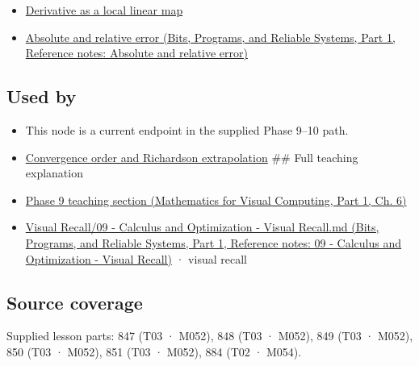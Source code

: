 \begin{itemize}
\tightlist
\item
  \hyperref[appendix-7bc181935c42]{Derivative as a local linear map}
\item
  \href{../01-Bits-Programs-and-Reliable-Systems-P01/main.pdf\#nameddest=appendix-3ae74e89b4e6}{Absolute and relative error (Bits, Programs, and Reliable Systems, Part 1, Reference notes: Absolute and relative error)}
\end{itemize}

\subsection{Used by}\label{appendix-e2d7b4f2161d-used-by}

\hypertarget{appendix-e2d7b4f2161d-used-by}{}

\begin{itemize}
\item
  This node is a current endpoint in the supplied Phase 9--10 path.
\item
  \hyperref[appendix-aca80b6bf17a]{Convergence order and Richardson extrapolation} \#\# Full teaching explanation
\item
  \href{../02-Mathematics-for-Visual-Computing-P01/main.pdf\#nameddest=02-foundations-ii-ch022-numerical-differentiation-and-automatic-differentiation}{Phase 9 teaching section (Mathematics for Visual Computing, Part 1, Ch. 6)}
\item
  \href{../01-Bits-Programs-and-Reliable-Systems-P01/main.pdf\#nameddest=appendix-adf48f5dc5c1}{Visual Recall/09 - Calculus and Optimization - Visual Recall.md (Bits, Programs, and Reliable Systems, Part 1, Reference notes: 09 - Calculus and Optimization - Visual Recall)} · visual recall
\end{itemize}

\subsection{Source coverage}\label{appendix-e2d7b4f2161d-source-coverage}

\hypertarget{appendix-e2d7b4f2161d-source-coverage}{}

Supplied lesson parts: 847 (T03 · M052), 848 (T03 · M052), 849 (T03 · M052), 850 (T03 · M052), 851 (T03 · M052), 884 (T02 · M054).
